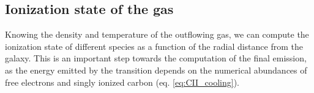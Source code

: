 \subsection{Ionization state of the gas}\label{sec:ionization_structure}


Knowing the density and temperature of the outflowing gas, we can compute the ionization state of different species as a function of the radial distance from the galaxy. This is an important step towards the computation of the final \CII emission, as the energy emitted by the \CII transition depends on the numerical abundances of free electrons and singly ionized carbon (eq. \ref{eq:CII_cooling}).


